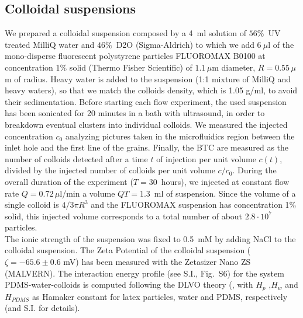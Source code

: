 \documentclass[singlecolumn,pre,notitlepage,preprintnumbers,floatfix,superscriptaddress]{revtex4-1}
\begin{document}
\subsection*{Colloidal suspensions}
\noindent
We prepared a colloidal suspension composed by a 4~ml solution of $56 \%$~UV treated MilliQ water and $46\%$~D2O (Sigma-Aldrich) to which we add $6~\mu$l of the mono-disperse fluorescent polystyrene particles FLUOROMAX B0100 at concentration 1\% solid (Thermo Fisher Scientific) of $1.1 \, \mu$m diameter, $R = 0.55 \, \mu$m of radius. Heavy water is added to the suspension (1:1 mixture of MilliQ and heavy waters), so that we match the colloids density, which is 1.05 g/ml, to avoid their sedimentation. Before starting each flow experiment, the used suspension has been sonicated for 20 minutes in a bath with ultrasound, in order to breakdown eventual clusters into individual colloids. We measured the injected concentration $c_0$ analyzing pictures taken in the microfluidics region between the inlet hole and the first line of the grains. Finally, the BTC are measured as the number of colloids detected after a time $t$ of injection per unit volume $c(t)$, divided by the injected number of colloids per unit volume $c/c_0$. During the overall duration of the experiment ($T = 30$~hours), we injected at constant flow rate $Q = 0.72 \, \mu$l/min a volume $QT = 1.3$~ml of suspension. Since the volume of a single colloid is $4/3 \pi R^3$ and the FLUOROMAX suspension has concentration 1\% solid, this injected volume corresponds to a total number of about $2.8 \cdot 10^7$ particles. \\

\noindent
The ionic strength of the suspension was fixed to 0.5~mM by adding NaCl to the colloidal suspension. The Zeta Potential of the colloidal suspension ($\zeta = -65.6 \pm 0.6$ mV) has been measured with the Zetasizer Nano ZS (MALVERN). The interaction energy profile (see S.I., Fig.~S6) for the system PDMS-water-colloids is computed following the DLVO theory (\cite{ruckenstein_adsorption_1976, Hogg1966,Elimbook}, with $H_p$ ,$H_w$ and $H_{PDMS}$ as Hamaker constant for latex particles, water and PDMS, respectively (\cite{ruckenstein_adsorption_1976, Hogg1966,yu_evaporative_2017}and S.I. for details).
\end{document}
